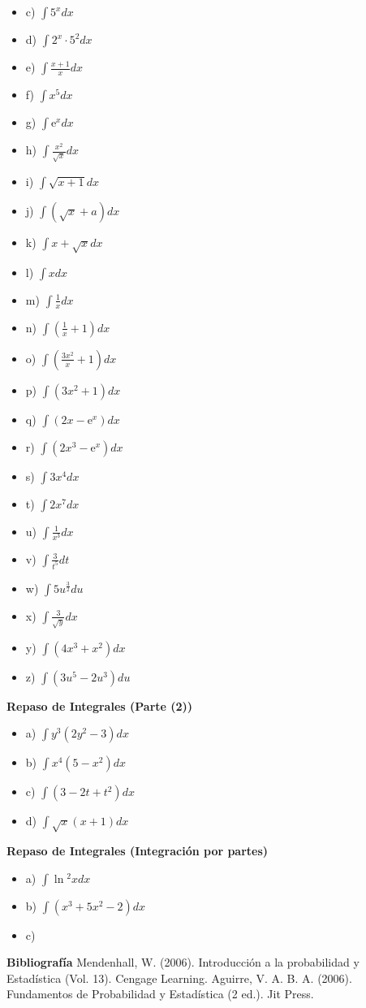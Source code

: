 \documentclass{../oxmathproblems}
\begin{document}
\begin{questions}
\begin{itemize}
\item c) $ \int 5^x dx  $ 
\item d) $ \int 2^x \cdot 5^2 dx $ 
\item e) $ \int \frac{x+1}{x} dx $ 
\item f) $ \int x^5 dx $ 
\item g) $ \int \mathrm{e}^x dx $ 
\item h) $ \int \frac{x^2}{\sqrt{x}} dx $ 
\item i) $ \int  \sqrt{x+1} dx $ 
\item j) $ \int  (\sqrt{x} + a) dx $ 
\item k) $ \int x + \sqrt{x} dx $ 
\item l) $ \int x  dx $ 
\item m) $ \int \frac{1}{x} dx  $
\item n) $ \int (\frac{1}{x} + 1) dx $
\item o) $ \int (\frac{3x^2}{x} + 1 ) dx $ 
\item p) $ \int (3x^2 + 1 ) dx $ 
\item q) $ \int (2x - \mathrm{e}^x ) dx $ 
\item r) $ \int (2x^3 - \mathrm{e}^x ) dx $ 
\item s) $ \int 3x^4 dx $ 
\item t)  $ \int 2x^7 dx $ 
\item u)  $ \int \frac{1}{x^3} dx $ 
\item v) $ \int \frac{3}{t^5} dt $ 
\item w) $ \int 5u^{\frac{3}{2}} du $ 
\item x) $ \int  \frac{3}{\sqrt{y}} dx $ 
\item y) $ \int (4x^3 + x^2) dx $ 
\item z) $ \int (3u^5 - 2u^3) du $ 

\end{itemize}



\miquestion \textbf{Repaso de Integrales (Parte (2))}
\begin{itemize}
\item a) $ \int y^3(2y^2 - 3) dx $ 
\item b) $ \int x^4(5 - x^2) dx $ 
\item c) $ \int (3 -2t + t^2) dx $ 
\item d) $ \int \sqrt{x}(x+1) dx $ 
\end{itemize}

\miquestion \textbf{Repaso de Integrales (Integración por partes)}
\begin{itemize}
\item a) $ \int \ln{^2}x dx $ 
\item b) $ \int (x^3 + 5x^2 - 2) dx $ 
\item c) 
\end{itemize}


\end{questions}




\textbf{Bibliografía}
Mendenhall, W. (2006). Introducción a la probabilidad y Estadística (Vol. 13). Cengage Learning.
Aguirre, V. A. B. A. (2006). Fundamentos de Probabilidad y Estadística (2 ed.). Jit Press.
\end{document}
